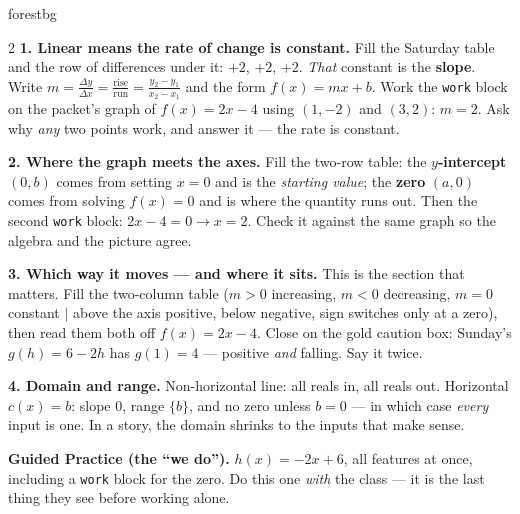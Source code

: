 \documentclass[10pt]{article}
\begin{document}
\begin{skillbox}{forestbg}
\begin{multicols}{2}
\textbf{1. Linear means the rate of change is constant.} Fill the Saturday table and the row of
differences under it: $+2$, $+2$, $+2$. \emph{That} constant is the \textbf{slope}. Write
$m=\frac{\Delta y}{\Delta x}=\frac{\text{rise}}{\text{run}}=\frac{y_2-y_1}{x_2-x_1}$ and the form
$f(x)=mx+b$. Work the \texttt{work} block on the packet's graph of $f(x)=2x-4$ using $(1,-2)$ and
$(3,2)$: $m=2$. Ask why \emph{any} two points work, and answer it --- the rate is constant.

\textbf{2. Where the graph meets the axes.} Fill the two-row table: the \textbf{$y$-intercept}
$(0,b)$ comes from setting $x=0$ and is the \emph{starting value}; the \textbf{zero} $(a,0)$ comes
from solving $f(x)=0$ and is where the quantity runs out. Then the second \texttt{work} block:
$2x-4=0 \to x=2$. Check it against the same graph so the algebra and the picture agree.

\columnbreak
\textbf{3. Which way it moves --- and where it sits.} This is the section that matters. Fill the
two-column table ($m>0$ increasing, $m<0$ decreasing, $m=0$ constant $\mid$ above the axis positive,
below negative, sign switches only at a zero), then read them both off $f(x)=2x-4$. Close on the
gold caution box: Sunday's $g(h)=6-2h$ has $g(1)=4$ --- positive \emph{and} falling. Say it twice.

\textbf{4. Domain and range.} Non-horizontal line: all reals in, all reals out. Horizontal
$c(x)=b$: slope $0$, range $\{b\}$, and no zero unless $b=0$ --- in which case \emph{every} input is
one. In a story, the domain shrinks to the inputs that make sense.

\textbf{Guided Practice (the ``we do'').} $h(x)=-2x+6$, all features at once, including a
\texttt{work} block for the zero. Do this one \emph{with} the class --- it is the last thing they
see before working alone.
\end{multicols}
\end{skillbox}
\end{document}
